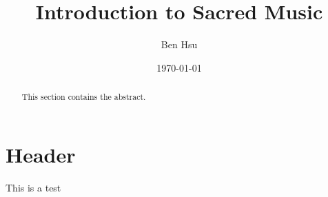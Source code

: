 \documentclass[16pt,oneside,notitlepage]{article} %
\begin{document}
\title{Introduction to Sacred Music}
\author{Ben Hsu}
\date{\today}
\maketitle

\begin{abstract}
This section contains the abstract.
\end{abstract}


\def\greinitialformat#1{%
  {\fontsize{43}{43}\selectfont #1}%
}



\redlines

\section{Header}

\begin{paragraph}
This is a test
\end{paragraph}

\end{document}
